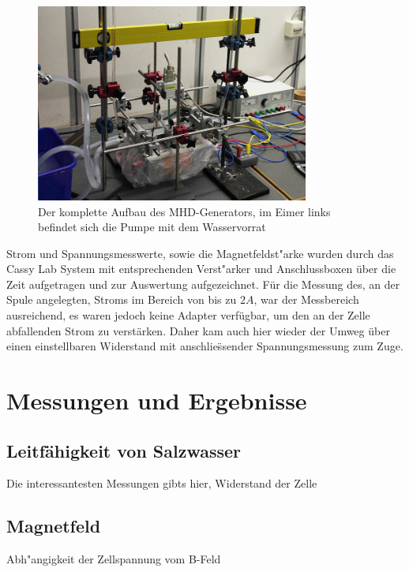 \documentclass[11pt]{scrartcl}
\begin{document}
\begin{figure}[ht]
\begin{center}
\includegraphics[width=0.8\textwidth]{images/wwaage.jpg}
\end{center}
\vspace{-1.5\baselineskip}
\caption{Der komplette Aufbau des MHD-Generators, im Eimer links befindet sich die Pumpe mit dem Wasservorrat}
\label{wwaage}
\end{figure}

Strom und Spannungsmesswerte, sowie die Magnetfeldst"arke wurden durch das Cassy Lab System mit entsprechenden Verst"arker und Anschlussboxen \"uber die Zeit aufgetragen und zur Auswertung aufgezeichnet. F\"ur die Messung des, an der Spule angelegten, Stroms im Bereich von bis zu $2A$, war der Messbereich ausreichend, es waren jedoch keine Adapter verf\"ugbar, um den an der Zelle abfallenden Strom zu verst\"arken. Daher kam auch hier wieder der Umweg \"uber einen einstellbaren Widerstand mit anschlie\"ssender Spannungsmessung zum Zuge.





\section{Messungen und Ergebnisse}

\subsection{Leitfähigkeit von Salzwasser}\label{leit}		%
Die interessantesten Messungen gibts hier, Widerstand der Zelle

\subsection{Magnetfeld}			%
Abh"angigkeit der Zellspannung vom B-Feld
\end{document}

